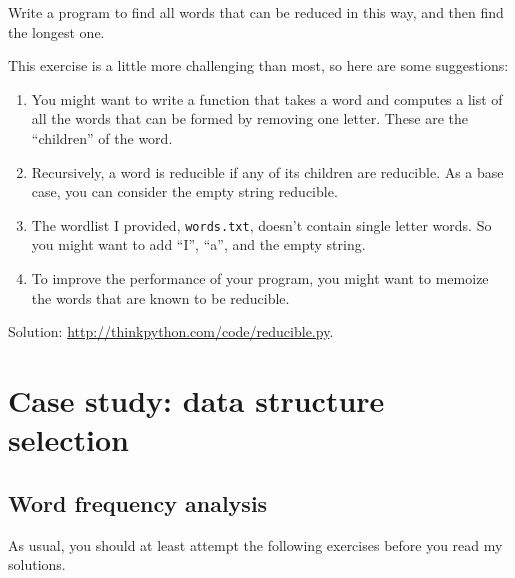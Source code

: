 \documentclass[10pt]{book}
\begin{document}
\begin{CJK}{UTF8}{gbsn}
\begin{exercise}
Write a program to find all words that can be reduced in this way,
and then find the longest one.

This exercise is a little more challenging than most, so here are
some suggestions:

\begin{enumerate}

\item You might want to write a function that takes a word and
  computes a list of all the words that can be formed by removing one
  letter.  These are the ``children'' of the word.

\item Recursively, a word is reducible if any of its children
are reducible.  As a base case, you can consider the empty
string reducible.

\item The wordlist I provided, {\tt words.txt}, doesn't
contain single letter words.  So you might want to add
``I'', ``a'', and the empty string.

\item To improve the performance of your program, you might want
to memoize the words that are known to be reducible.

\end{enumerate}

Solution: \url{http://thinkpython.com/code/reducible.py}.

\end{exercise}








\chapter{Case study: data structure selection}

\section{Word frequency analysis}
\label{analysis}

As usual, you should at least attempt the following exercises
before you read my solutions.

\begin{exercise}


\end{exercise}
\end{CJK}
\end{document}
